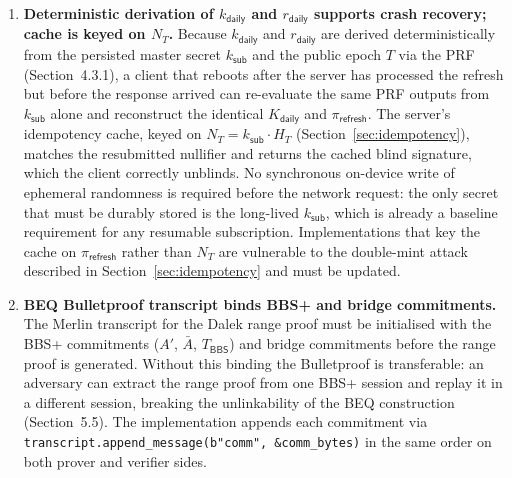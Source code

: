 \documentclass[11pt]{article}
\theoremstyle{definitionstyle}
\theoremstyle{plain}
\begin{document}
\begin{enumerate}[leftmargin=*,label=\textbf{C\arabic*.}]
  Furthermore, the idempotency cache key \textbf{must} be derived from the epoch nullifier $N_T$ (Section~\ref{sec:idempotency}) and not from $\pi_{\mathsf{refresh}}$ or $K_{\mathsf{daily}}$ alone.  The latter values incorporate the ephemeral blinding scalar $r_{\mathsf{daily}}$, which an adversarial client may re-sample between retries.  If the cache key were proof-based, an adversary who detects a crash (via timeout) could submit a second request with fresh randomness, producing a different cache key, missing the earlier entry, and---because $N_T$ was never inserted during the crash---obtaining a second distinct daily token for the same epoch.  An $N_T$-keyed cache closes this gap: the adversary cannot alter $N_T$ without forging a new master credential, so any request with the same $N_T$ necessarily hits the existing entry and receives the already-issued response.

\item \textbf{Deterministic derivation of $k_{\mathsf{daily}}$ and $r_{\mathsf{daily}}$ supports crash recovery; cache is keyed on $N_T$.}
  Because $k_{\mathsf{daily}}$ and $r_{\mathsf{daily}}$ are derived deterministically from the persisted master secret $k_{\mathsf{sub}}$ and the public epoch $T$ via the PRF (Section~4.3.1), a client that reboots after the server has processed the refresh but before the response arrived can re-evaluate the same PRF outputs from $k_{\mathsf{sub}}$ alone and reconstruct the identical $K_{\mathsf{daily}}$ and $\pi_{\mathsf{refresh}}$.  The server's idempotency cache, keyed on $N_T = k_{\mathsf{sub}} \cdot H_T$ (Section~\ref{sec:idempotency}), matches the resubmitted nullifier and returns the cached blind signature, which the client correctly unblinds.  No synchronous on-device write of ephemeral randomness is required before the network request: the only secret that must be durably stored is the long-lived $k_{\mathsf{sub}}$, which is already a baseline requirement for any resumable subscription.  Implementations that key the cache on $\pi_{\mathsf{refresh}}$ rather than $N_T$ are vulnerable to the double-mint attack described in Section~\ref{sec:idempotency} and must be updated.

\item \textbf{BEQ Bulletproof transcript binds BBS+ and bridge commitments.}
  The Merlin transcript for the Dalek range proof must be initialised with the
  BBS+ commitments ($A'$, $\bar{A}$, $T_{\mathsf{BBS}}$) and bridge
  commitments before the range proof is generated.  Without this binding the
  Bulletproof is transferable: an adversary can extract the range proof from
  one BBS+ session and replay it in a different session, breaking the
  unlinkability of the BEQ construction (Section~5.5).  The implementation
  appends each commitment via
  \texttt{transcript.append\_message(b"comm", \&comm\_bytes)} in the same
  order on both prover and verifier sides.


\end{enumerate}
\end{document}
